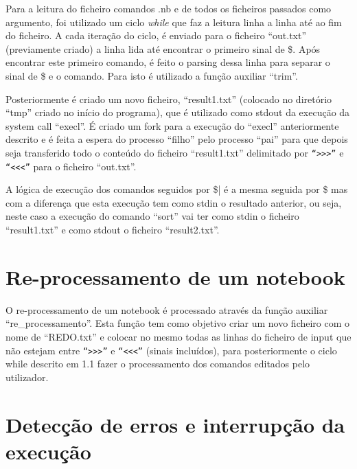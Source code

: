 \documentclass[11pt,a4paper]{report}
\begin{document}

Para a leitura do ficheiro comandos .nb e de todos os ficheiros passados como argumento, foi utilizado um ciclo \textit{while} que faz a leitura linha a linha até ao fim do ficheiro.
A cada iteração do ciclo, é enviado para o ficheiro “out.txt” (previamente criado) a linha lida até encontrar o primeiro sinal de \$. Após encontrar este primeiro comando, é feito o parsing dessa linha para separar o sinal de \$ e o comando. Para isto é utilizado a função auxiliar “trim”.


Posteriormente é criado um novo ficheiro, “result1.txt” (colocado no diretório “tmp” criado no início do programa), que é utilizado como stdout da execução da system call “execl”.
É criado um fork para a execução do “execl” anteriormente descrito e é feita a espera do processo “filho” pelo processo “pai” para que depois seja transferido todo o conteúdo do ficheiro “result1.txt” delimitado por \verb|“>>>”| e \verb|“<<<”|  para o ficheiro “out.txt”.


A lógica de execução dos comandos seguidos por \$| é a mesma seguida por \$ mas com a diferença que esta execução tem como stdin o resultado anterior, ou seja, neste caso a execução do comando “sort” vai ter como stdin o ficheiro “result1.txt” e como stdout o ficheiro “result2.txt”.



\section{Re-processamento de um notebook}

O re-processamento de um notebook é processado através da função auxiliar “re_processamento”. Esta função tem como objetivo criar um novo ficheiro com o nome de “REDO.txt” e colocar no mesmo todas as linhas do ficheiro de input que não estejam entre \verb|“>>>”| e \verb|“<<<”| (sinais incluídos), para posteriormente o ciclo while descrito em 1.1 fazer o processamento dos comandos editados pelo utilizador.



\section{Detecção de erros e interrupção da execução}
\end{document}
